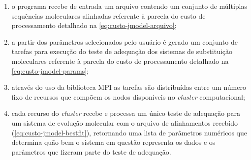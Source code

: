 \documentclass[english,brazilian]{UNISINOSmonografia} %
\begin{document}
\begin{enumerate}[label={\arabic*)}]
	
	\item o programa recebe de entrada um arquivo contendo um conjunto de múltiplas sequências moleculares alinhadas referente à parcela do custo de processamento detalhado na \autoref{eq:custo-jmodel-arquivo};
	
	\item a partir dos parâmetros selecionados pelo usuário é gerado um conjunto de tarefas para execução do teste de adequação dos sistemas de substituição moleculares referente à parcela do custo de processamento detalhado na \autoref{eq:custo-jmodel-params};
	
	\item através do uso da biblioteca MPI as tarefas são distribuídas entre um número fixo de recursos que compõem os nodos disponíveis no \textit{cluster} computacional;
	
	\item cada recurso do \textit{cluster} recebe e processa um único teste de adequação para um sistema de evolução molecular com o arquivo de alinhamentos recebido (\autoref{eq:custo-jmodel-bestfit}), retornando uma lista de parâmetros numéricos que determina quão bem o sistema em questão representa os dados e os parâmetros que fizeram parte do teste de adequação.
	
\end{enumerate}
\end{document}
